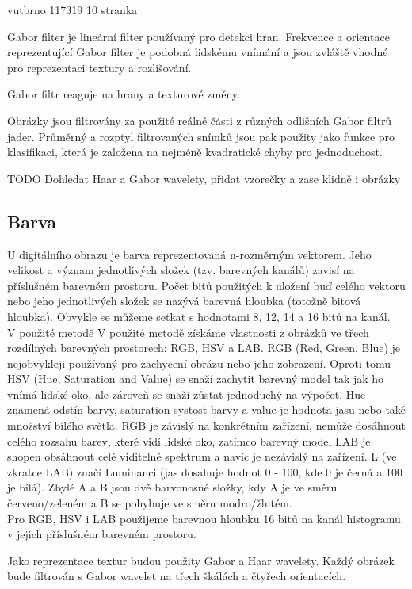 \documentclass{report}
\begin{document}
vutbrno 117319 10 stranka

Gabor filter je lineární filter používaný pro detekci hran. Frekvence a orientace reprezentující Gabor filter je podobná lidskému vnímání a jsou zvláště vhodné pro reprezentaci textury a rozlišování. 

Gabor filtr reaguje na hrany a texturové změny. 

Obrázky jsou filtrovány za použité reálné části z různých odlišních Gabor filtrů jader. Průměrný a rozptyl filtrovaných snímků jsou pak použity jako funkce pro klasifikaci, která je založena na nejméně kvadratické chyby pro jednoduchost.

TODO Dohledat Haar a Gabor wavelety, přidat vzorečky a zase klidně i obrázky

\subsection{Barva}
U digitálního obrazu je barva reprezentovaná n-rozměrným vektorem. Jeho velikost a význam jednotlivých složek (tzv. barevných kanálů) zavisí na příslušném barevném prostoru. Počet bitů použitých k uložení buď celého vektoru nebo jeho jednotlivých složek se nazývá barevná hloubka (totožně bitová hloubka). Obvykle se můžeme setkat s hodnotami 8, 12, 14 a 16 bitů na kanál.
\\
V použité metodě V použité metodě získáme vlastnosti z obrázků ve třech rozdílných barevných prostorech: RGB, HSV a LAB. RGB (Red, Green, Blue) je nejobvykleji používaný pro zachycení obrázu nebo jeho zobrazení. Oproti tomu HSV (Hue, Saturation and Value) se snaží zachytit barevný model tak jak ho vnímá lidské oko, ale zároveň se snaží zůstat jednoduchý na výpočet. Hue znamená odstín barvy, saturation systost barvy a value je hodnota jasu nebo také množství bílého světla. RGB je závislý na konkrétním zařízení, nemůže dosáhnout celého rozsahu barev, které vidí lidské oko, zatímco barevný model LAB je shopen obsáhnout celé viditelné spektrum a navíc je nezávislý na zařízení. L (ve zkratce LAB) značí Luminanci (jas dosahuje hodnot 0 - 100, kde 0 je černá a 100 je bílá). Zbylé A a B jsou dvě barvonosné složky, kdy A je ve směru červeno/zeleném a B se pohybuje ve směru modro/žlutém. 
\\
Pro RGB, HSV i LAB použijeme barevnou hloubku 16 bitů na kanál histogramu v jejich příslušném barevném prostoru. 

Jako reprezentace textur budou použity Gabor a Haar wavelety. Každý obrázek bude filtrován s Gabor wavelet na třech škálách a čtyřech orientacích. 
\end{document}
